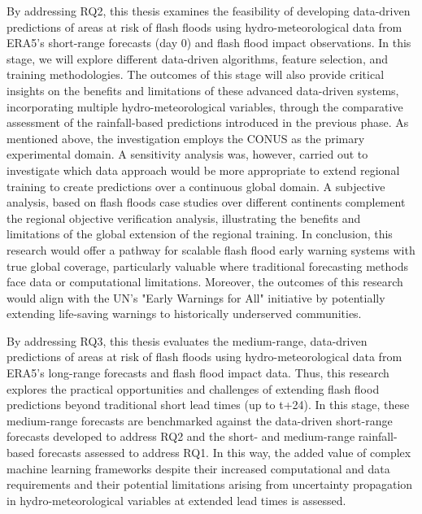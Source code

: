 By addressing RQ2, this thesis examines the feasibility of developing data-driven predictions of areas at risk of flash floods using hydro-meteorological data from ERA5's short-range forecasts (day 0) and flash flood impact observations. In this stage, we will explore different data-driven algorithms, feature selection, and training methodologies. The outcomes of this stage will also provide critical insights on the benefits and limitations of these advanced data-driven systems, incorporating multiple hydro-meteorological variables, through the comparative assessment of the rainfall-based predictions introduced in the previous phase. As mentioned above, the investigation employs the CONUS as the primary experimental domain. A sensitivity analysis was, however, carried out to investigate which data approach would be more appropriate to extend regional training to create predictions over a continuous global domain. A subjective analysis, based on flash floods case studies over different continents complement the regional objective verification analysis, illustrating the benefits and limitations of the global extension of the regional training. In conclusion, this research would offer a pathway for scalable flash flood early warning systems with true global coverage, particularly valuable where traditional forecasting methods face data or computational limitations. Moreover, the outcomes of this research would align with the UN's "Early Warnings for All" initiative by potentially extending life-saving warnings to historically underserved communities.

By addressing RQ3, this thesis evaluates the medium-range, data-driven predictions of areas at risk of flash floods using hydro-meteorological data from ERA5's long-range forecasts and flash flood impact data. Thus, this research explores the practical opportunities and challenges of extending flash flood predictions beyond traditional short lead times (up to t+24). In this stage, these medium-range forecasts are benchmarked against the data-driven short-range forecasts developed to address RQ2 and the short- and medium-range rainfall-based forecasts assessed to address RQ1. In this way, the added value of complex machine learning frameworks despite their increased computational and data requirements and their potential limitations arising from uncertainty propagation in hydro-meteorological variables at extended lead times is assessed.


